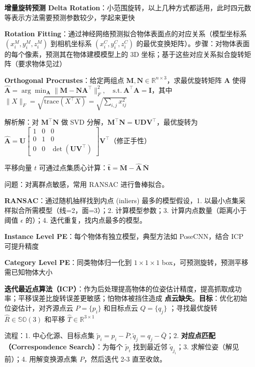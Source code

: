 \documentclass[
  8pt]{extarticle}
\begin{document}
\begin{multicols*}{4}
\textbf{增量旋转预测 Delta
Rotation}：小范围旋转，以上几种方式都适用，此时四元数等表示方法需要预测参数较少，学起来更快

\textbf{Rotation
Fitting}：通过神经网络预测拟合物体表面点的对应关系（模型坐标系
\((x_i^M, y_i^M, z_i^M)\) 到相机坐标系 \((x_i^C, y_i^C, z_i^C)\)
的最优变换矩阵）。步骤：对物体表面的每个像素，预测其在物体建模模型上的
3D 坐标；基于这些对应关系拟合旋转矩阵（要求物体见过）

\textbf{Orthogonal Procrustes}：给定两组点
\(\mathbf{M}, \mathbf{N} \in \mathbb{R}^{n \times 3}\)，求最优旋转矩阵
\(\mathbf{A}\) 使得
\(\hat{\mathbf{A}} = \arg\min_{\mathbf{A}} \|\mathbf{M} - \mathbf{N}\mathbf{A}^\top\|_F^2, \quad \text{s.t.}~\mathbf{A}^\top\mathbf{A} = \mathbf{I}\)，其中
\(\|X\|_F = \sqrt{\text{trace}(X^{\top}X)} = \sqrt{\sum_{i,j} x_{ij}^2}\)

解析解：对 \(\mathbf{M}^\top\mathbf{N}\) 做 SVD
分解，\(\mathbf{M}^\top\mathbf{N} = \mathbf{UDV}^\top\)，最优旋转为
\(\hat{\mathbf{A}} = \mathbf{U}\begin{bmatrix} 1 & 0 & 0 \\ 0 & 1 & 0 \\ 0 & 0 & \det(\mathbf{UV}^{\top}) \end{bmatrix}\mathbf{V}^{\top}\)（修正手性）

平移向量 \(t\)
可通过点集质心计算：\(\hat{\mathbf{t}} = \overline{\mathbf{M}} - \hat{\mathbf{A}}\,\overline{\mathbf{N}}\)

问题：对离群点敏感，常用 RANSAC 进行鲁棒拟合。

\textbf{RANSAC}：通过随机抽样找到内点 (inliers) 最多的模型假设，1.
以最小点集采样拟合所需模型（线=2，面=3）；2. 计算模型参数；3.
计算内点数量（距离小于阈值 \(\epsilon\) 的）；4.
迭代重复，找内点最多的模型。

\textbf{Instance Level PE}：每个物体有独立模型，典型方法如 PoseCNN，结合
ICP 可提升精度

\textbf{Category Level PE}：同类物体归一化到 \(1\times1\times1\)
box，可预测旋转，预测平移需已知物体大小

\textbf{迭代最近点算法（ICP）}：作为后处理提高物体的位姿估计精度，提高抓取成功率；平移误差比旋转误差更敏感；怕物体被挡住造成
\textbf{点云缺失}。\textbf{目标}：优化初始位姿估计，对齐源点云
\(P = \{p_i\}\) 和目标点云 \(Q = \{q_j\}\) ；寻找最优旋转
\(\hat{R} \in\mathbb{SO}(3)\) 和平移
\(\hat{T}\in\mathbb{R}^{3\times 1}\)

流程：1. 中心化源、目标点集
\(\tilde{p}_i = p_i - \bar{P}, \tilde{q}_j = q_j - \bar{Q}\)；2.
\textbf{对应点匹配（Correspondence Search）}：为每个 \(\tilde{p}_i\)
找到最近邻 \(\tilde{q}_{j_i}\)；3. 求解位姿（解见前）；4. 用解变换源点集
\(P\)，然后迭代 2-3 直至收敛。


\end{multicols*}
\end{document}
